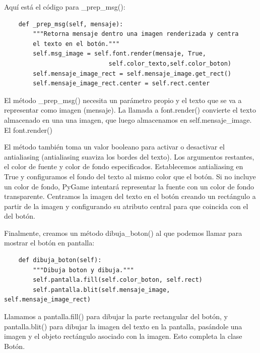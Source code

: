 Aquí está el código para \_prep\_msg():

\hspace{-2.5cm}{\ttfamily \scriptsize boton.py}  \vspace{-0.5cm}
\begin{lstlisting}		
    def _prep_msg(self, mensaje):
        """Retorna mensaje dentro una imagen renderizada y centra 
        el texto en el botón."""
        self.msg_image = self.font.render(mensaje, True, 
                             self.color_texto,self.color_boton)
        self.mensaje_image_rect = self.mensaje_image.get_rect()
        self.mensaje_image_rect.center = self.rect.center
\end{lstlisting}


El método {\ttfamily\_prep\_msg()} necesita un parámetro propio y el texto que se va a representar 
como imagen (mensaje). La llamada a {\ttfamily font.render()} convierte el texto almacenado en una
una imagen, que luego almacenamos en {\ttfamily self.mensaje\_image}. El {\ttfamily font.render()}

El método también toma un valor booleano para activar o desactivar el antialiasing (antialiasing
suaviza los bordes del texto). Los argumentos restantes, el  color de fuente y color de fondo especificados. 
Establecemos antialiasing en True y configuramos el fondo del texto al mismo color que el botón. Si no incluye
un color de fondo, PyGame intentará representar la fuente con un color de fondo transparente.
Centramos la imagen del texto en el botón creando un rectángulo  a partir de la imagen y configurando su atributo 
central para que coincida con el del botón.


Finalmente, creamos un método {\ttfamily dibuja\_boton()} al que podemos llamar para mostrar el botón en pantalla:


\hspace{-2.5cm}{\ttfamily \scriptsize boton.py}  \vspace{-0.5cm}
\begin{lstlisting}
    def dibuja_boton(self):
        """Dibuja boton y dibuja."""
        self.pantalla.fill(self.color_boton, self.rect)
        self.pantalla.blit(self.mensaje_image, self.mensaje_image_rect)
\end{lstlisting}

Llamamos a {\ttfamily pantalla.fill()} para dibujar la parte rectangular del botón, y
 {\ttfamily  pantalla.blit()} para dibujar la imagen del texto en la pantalla, pasándole una imagen
y el objeto {\ttfamily rectángulo } asociado con la imagen. Esto completa la clase Botón.

